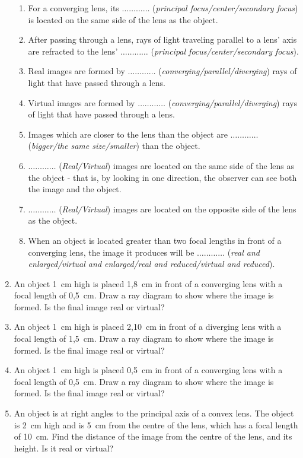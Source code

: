 \begin{enumerate}
{\begin{enumerate}
\item For a converging lens, its $\ldots\ldots\ldots\ldots$ (\textit{principal focus/center/secondary focus}) is located on the same side of the lens as the object.
\item After passing through a lens, rays of light traveling parallel to a lens' axis are refracted to the lens' $\ldots\ldots\ldots\ldots$ (\textit{principal focus/center/secondary focus}).
\item Real images are formed by $\ldots\ldots\ldots\ldots$ (\textit{converging/parallel/diverging}) rays of light that have passed through a lens.
\item Virtual images are formed by $\ldots\ldots\ldots\ldots$ (\textit{converging/parallel/diverging}) rays of light that have passed through a lens.
\item Images which are closer to the lens than the object are $\ldots\ldots\ldots\ldots$ (\textit{bigger/the same size/smaller}) than the object.
\item $\ldots\ldots\ldots\ldots$ (\textit{Real/Virtual}) images are located on the same side of the lens as the object - that is, by looking in one direction, the observer can see both the image and the object.
\item $\ldots\ldots\ldots\ldots$ (\textit{Real/Virtual}) images are located on the opposite side of the lens as the object.
\item When an object is located greater than two focal lengths in front of a converging lens, the image it produces will be $\ldots\ldots\ldots\ldots$ (\textit{real and enlarged/virtual and enlarged/real and reduced/virtual and reduced}).
\end{enumerate}}
\item An object 1~cm high is placed 1,8~cm in front of a converging lens with a focal length of 0,5~cm. Draw a ray diagram to show where the image is formed. Is the final image real or virtual?
\item An object 1~cm high is placed 2,10~cm in front of a diverging lens with a focal length of 1,5~cm. Draw a ray diagram to show where the image is formed. Is the final image real or virtual?
\item An object 1~cm high is placed 0,5~cm in front of a converging lens with a focal length of 0,5~cm. Draw a ray diagram to show where the image is formed. Is the final image real or virtual?
\item An object is at right angles to the principal axis of a convex lens. The object is 2~cm high and is 5~cm from the centre of the lens, which has a focal length of 10~cm. Find the distance of the image from the centre of the lens, and its height. Is it real or virtual?

\end{enumerate}
